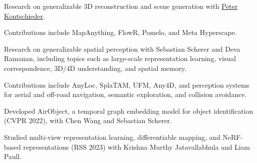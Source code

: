 
\begin{cventry}
\begin{cvitems}
  \item Research on generalizable 3D reconstruction and scene generation with \href{https://www.linkedin.com/in/peter-kontschieder-2a6410134/}{Peter Kontschieder}.
  \item Contributions include MapAnything, FlowR, Pomelo, and Meta Hyperscape.
\end{cvitems}
\end{cventry}

\begin{cventry}
\begin{cvitems}
  \item Research on generalizable spatial perception with Sebastian Scherer and Deva Ramanan, including topics such as large-scale representation learning, visual correspondence, 3D/4D understanding, and spatial memory.
  \item Contributions include AnyLoc, SplaTAM, UFM, Any4D, and perception systems for aerial and off-road navigation, semantic exploration, and collision avoidance.
\end{cvitems}
\end{cventry}

\begin{cventry}
\begin{cvitems}
  \item Developed AirObject, a temporal graph embedding model for object identification (CVPR 2022), with Chen Wang and Sebastian Scherer.
\end{cvitems}
\end{cventry}

\begin{cventry}
\begin{cvitems}
  \item Studied multi-view representation learning, differentiable mapping, and NeRF-based representations (RSS 2023) with Krishna Murthy Jatavallabhula and Liam Paull.
\end{cvitems}
\end{cventry}

